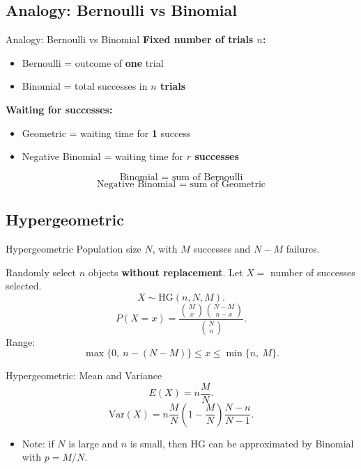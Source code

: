 \documentclass{beamer}
\begin{document}
\subsection{Analogy: Bernoulli vs Binomial}

\begin{frame}{Analogy: Bernoulli vs Binomial}
\textbf{Fixed number of trials $n$:}
\begin{itemize}
  \item Bernoulli = outcome of \textbf{one} trial
  \item Binomial = total successes in \textbf{$n$ trials}
\end{itemize}

\pause
\textbf{Waiting for successes:}
\begin{itemize}
  \item Geometric = waiting time for \textbf{1} success
  \item Negative Binomial = waiting time for \textbf{$r$ successes}
\end{itemize}

\pause
\[
\text{Binomial = sum of Bernoulli}
\]
\[
\text{Negative Binomial = sum of Geometric}
\]
\end{frame}

\subsection{Hypergeometric}

\begin{frame}{Hypergeometric}
Population size $N$, with $M$ successes and $N-M$ failures.

Randomly select $n$ objects \textbf{without replacement}.
Let $X=$ number of successes selected.
\[
X \sim \mathrm{HG}(n,N,M).
\]
\pause
\[
P(X=x)=\frac{\binom{M}{x}\binom{N-M}{n-x}}{\binom{N}{n}}.
\]
\pause
Range:
\[
\max\{0,\ n-(N-M)\}\le x \le \min\{n,\ M\}.
\]
\end{frame}

\begin{frame}{Hypergeometric: Mean and Variance}
\[
E(X)=n\frac{M}{N}.
\]
\[
\mathrm{Var}(X)=n\frac{M}{N}\left(1-\frac{M}{N}\right)\frac{N-n}{N-1}.
\]
\pause
\begin{itemize}
  \item Note: if $N$ is large and $n$ is small, then HG can be approximated by Binomial with $p=M/N$.
\end{itemize}
\end{frame}
\end{document}
